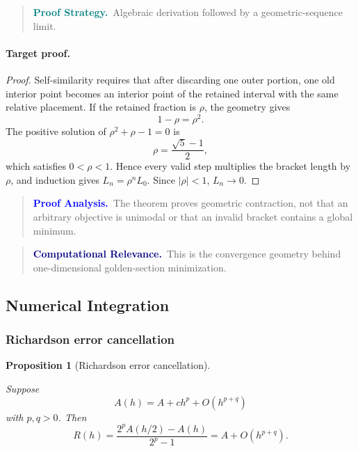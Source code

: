 \documentclass[10pt]{article}
\newtheorem{proposition}[theorem]{Proposition}
\theoremstyle{definition}
\theoremstyle{remark}
\newenvironment{proofstrategy}
{\begin{quote}\small\noindent\textbf{\textcolor{teal}{Proof Strategy.}}\ }
{\end{quote}}
\newenvironment{proofanalysis}
{\begin{quote}\small\noindent\textbf{\textcolor{blue}{Proof Analysis.}}\ }
{\end{quote}}
\newenvironment{computationalrelevance}
{\begin{quote}\small\noindent\textbf{\textcolor{navy}{Computational Relevance.}}\ }
{\end{quote}}
\begin{document}
\begin{proofstrategy}Algebraic derivation followed by a geometric-sequence limit.\end{proofstrategy}

\paragraph{Target proof.}

\begin{proof}

Self-similarity requires that after discarding one outer portion, one old interior
point becomes an interior point of the retained interval with the same relative
placement. If the retained fraction is $\rho$, the geometry gives
\[
1-\rho=\rho^2.
\]
The positive solution of $\rho^2+\rho-1=0$ is
\[
\rho=\frac{\sqrt5-1}{2},
\]
which satisfies $0<\rho<1$. Hence every valid step multiplies the bracket length
by $\rho$, and induction gives $L_n=\rho^nL_0$. Since $|\rho|<1$,
$L_n\to0$.

\end{proof}

\begin{proofanalysis}The theorem proves geometric contraction, not that an arbitrary objective is unimodal or that an invalid bracket contains a global minimum.\end{proofanalysis}

\begin{computationalrelevance}This is the convergence geometry behind one-dimensional golden-section minimization.\end{computationalrelevance}

\subsection{Numerical Integration}

\subsubsection{Richardson error cancellation}

\begin{proposition}[Richardson error cancellation]\label{prf:DER-RICHARDSON}

Suppose
\[
A(h)=A+c h^p+O(h^{p+q})
\]
with $p,q>0$. Then
\[
R(h)=\frac{2^pA(h/2)-A(h)}{2^p-1}
=
A+O(h^{p+q}).
\]

\end{proposition}
\end{document}
